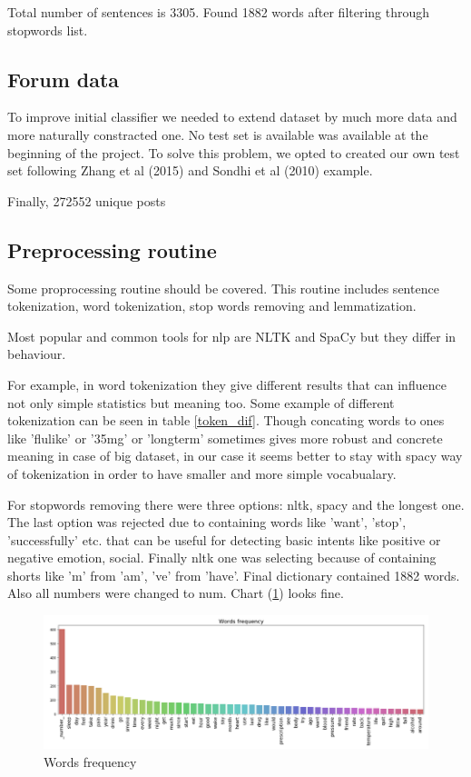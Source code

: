 \documentclass[11pt]{article}
\begin{document}
Total number of sentences is 3305. Found 1882 words after filtering through stopwords list. 

\subsection{Forum data}

To improve initial classifier we needed to extend dataset by much more data and more naturally constracted one. No  test  set  is  available was available at the beginning of the project. To  solve this  problem,  we  opted  to  created  our  own  test set following Zhang et al (2015) and Sondhi et al (2010) example.  

Finally, 272552 unique posts


\subsection{Preprocessing routine}

Some proprocessing routine should be covered. This routine includes sentence tokenization, word tokenization, stop words removing and lemmatization. 

Most popular and common tools for nlp are NLTK and SpaCy but they differ in behaviour.


For example, in word tokenization they give different results that can influence not only simple statistics but meaning too. Some example of different tokenization can be seen in table \ref{token_dif}. Though concating words to ones like 'flulike' or '35mg' or 'longterm' sometimes gives more robust and concrete meaning in case of big dataset, in our case it seems better to stay with spacy way of tokenization in order to have smaller and more simple vocabualary.

For stopwords removing there were three options: nltk, spacy and the longest one. The last option was rejected due to containing words like 'want', 'stop', 'successfully' etc. that can be useful for detecting basic intents like positive or negative emotion, social. Finally nltk one was selecting because of containing shorts like 'm' from 'am', 've' from 'have'. Final dictionary contained 1882 words. Also all numbers were changed to num. Chart (\ref{words_freq}) looks fine.

 \begin{figure}[h]
 	\centering
 	\includegraphics[scale=0.4]{report2.png}
	\caption{Words frequency}
 \label{words_freq}
 \end{figure}
\end{document}
